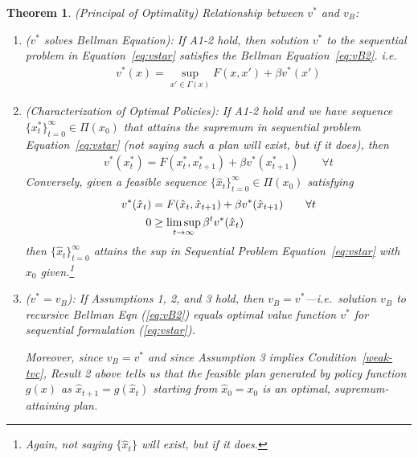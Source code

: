 \documentclass[12pt]{book}
\numberwithin{equation}{section} %
\theoremstyle{plain}
\newtheorem{thm}{Theorem}[section]
\theoremstyle{definition}
\theoremstyle{remark}
\newcommand{\ra}{\rightarrow}
\newcommand{\tinfz}{_{t=0}^\infty}
\begin{document}
\begin{thm}\emph{(Principal of Optimality)}
\label{thm:vstar-solves-bellman}
Relationship between $v^*$ and $v_B$:
\begin{enumerate}[label=\emph{(\roman*)}]
  \item
    \emph{($v^*$ solves Bellman Equation)}:
    If A1-2 hold, then solution $v^*$ to the sequential problem in
    Equation~\ref{eq:vstar} satisfies the Bellman Equation~\ref{eq:vB2}.
    i.e.\
    \begin{align*}
      v^*(x) =
      \sup_{x' \in \Gamma(x)}
      F(x,x') + \beta v^*(x')
    \end{align*}

  \item
    \emph{(Characterization of Optimal Policies)}:
    If A1-2 hold and we have sequence
    $\{x^*_t\}\tinfz\in\Pi(x_0)$ that \emph{attains the supremum} in
    sequential problem Equation~\ref{eq:vstar} (not saying such a plan
    will exist, but if it does), then
    \begin{align*}
      v^*(x^*_t) = F(x^*_t,x^*_{t+1}) + \beta v^*(x^*_{t+1})
      \qquad \forall t
    \end{align*}
    Conversely, given a feasible sequence
    $\{\hat{x}_t\}\tinfz \in\Pi(x_0)$ satisfying
    \begin{align}
      v^*(\hat{x}_t)
      &= F(\hat{x}_t,\hat{x}_{t+1})
        + \beta v^*(\hat{x}_{t+1}) \qquad \forall t\notag\\
      0 &\geq
      \limsup_{t\ra\infty}
      \beta^t v^*(\hat{x}_t)
      \label{weak-tvc}
    \end{align}
    then $\{\hat{x}_t\}\tinfz$ attains the sup in Sequential
    Problem Equation~\ref{eq:vstar} with $x_0$ given.\footnote{%
      Again, not saying $\{\hat{x}_t\}$ will exist, but if it does.}

  \item
    \emph{($v^*=v_B$)}:
    If Assumptions 1, 2, and 3 hold, then $v_B = v^*$---i.e.\ solution
    $v_B$ to recursive Bellman Eqn (\ref{eq:vB2}) equals
    optimal value function $v^*$ for sequential formulation
    (\ref{eq:vstar}).

    Moreover, since $v_B=v^*$ and since Assumption 3 implies
    Condition~\ref{weak-tvc}, Result 2 above tells us that the feasible
    plan generated by policy function $g(x)$ as $\hat{x}_{t+1} =
    g(\hat{x}_t)$ starting from $\hat{x}_0=x_0$ is an optimal,
    supremum-attaining plan.
\end{enumerate}
\end{thm}
\end{document}
